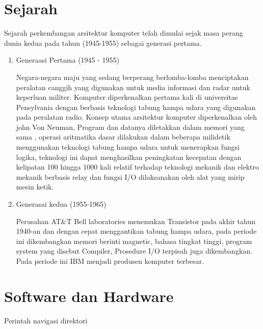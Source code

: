 \section{Sejarah}
Sejarah perkembangan arsitektur komputer telah dimulai sejak masa perang dunia kedua pada tahun (1945-1955) sebagai generasi pertama.
\begin{enumerate}
\item Generaasi Pertama (1945 - 1955)

Negara-negara maju yang sedang berperang berlomba-lomba menciptakan peralatan canggih yang digunakan untuk media informasi dan radar  untuk keperluan militer. Komputer diperkenalkan pertama kali di universitas Pensylvania dengan berbasis teknologi tabung hampa udara  yang digunakan pada peralatan radio. Konsep utama arsitektur komputer diperkenalkan oleh john Von Neuman,
Program dan datanya diletakkan dalam memori yang sama , operasi aritmatika dasar dilakukan dalam beberapa milidetik menggunakan teknologi tabung hampa udara untuk menerapkan fungsi logika, teknologi ini dapat menghasilkan peningkatan kecepatan  dengan kelipatan 100 hingga 1000 kali relatif terhadap teknologi mekanik dan elektro mekanik berbasis relay dan  fungsi I/O dilaksanakan oleh alat yang mirip mesin ketik.
\item Generasai kedua (1955-1965)

Perusahan AT\&T Bell laboratories menemukan Transistor pada akhir tahun 1940-an dan dengan cepat menggantikan tabung hampa udara, pada  periode ini dikembangkan memori berinti magnetic, bahasa tingkat tinggi, program system yang disebut Compiler, Prosedure I/O terpisah juga dikembangkan. Pada periode ini IBM menjadi produsen komputer terbesar.


\end{enumerate}



\section{Software dan Hardware}
Perintah navigasi direktori

